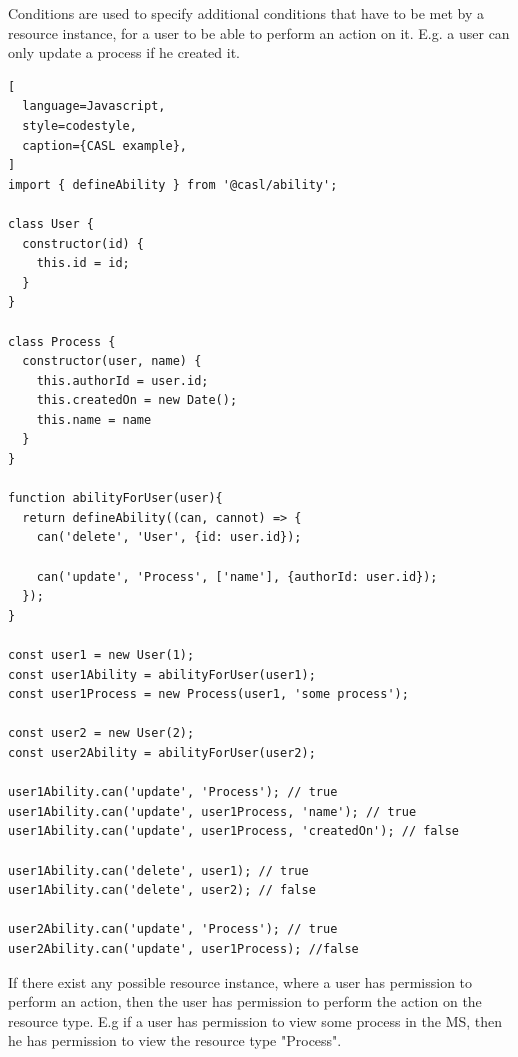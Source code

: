 Conditions are used to specify additional conditions that have to be met by a resource
instance, for a user to be able to perform an action on it. E.g. a user can only update a
process if he created it.

\begin{lstlisting}[
  language=Javascript,
  style=codestyle,
  caption={CASL example},
]
import { defineAbility } from '@casl/ability';

class User {
  constructor(id) {
    this.id = id;
  }
}

class Process {
  constructor(user, name) {
    this.authorId = user.id;
    this.createdOn = new Date();
    this.name = name
  }
}

function abilityForUser(user){
  return defineAbility((can, cannot) => {
    can('delete', 'User', {id: user.id});

    can('update', 'Process', ['name'], {authorId: user.id});
  });
}

const user1 = new User(1);
const user1Ability = abilityForUser(user1);
const user1Process = new Process(user1, 'some process');

const user2 = new User(2);
const user2Ability = abilityForUser(user2);

user1Ability.can('update', 'Process'); // true
user1Ability.can('update', user1Process, 'name'); // true
user1Ability.can('update', user1Process, 'createdOn'); // false

user1Ability.can('delete', user1); // true
user1Ability.can('delete', user2); // false

user2Ability.can('update', 'Process'); // true
user2Ability.can('update', user1Process); //false
\end{lstlisting}

If there exist any possible resource instance, where a user has permission to perform an action,
then the user has permission to perform the action on the resource type.
E.g if a user has permission to view some process in the MS, then he has permission to
view the resource type "Process".

